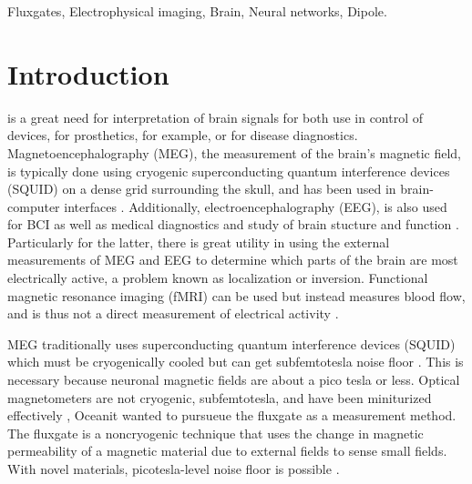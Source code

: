 \documentclass[journal,12pt,onecolumn,draftclsnofoot]{IEEEtran}
\begin{document}
\begin{IEEEkeywords}
Fluxgates, Electrophysical imaging, Brain, Neural networks, Dipole.
\end{IEEEkeywords}



\IEEEpeerreviewmaketitle



\section{Introduction}

 is a great need for interpretation of brain signals for both use in control of devices, for prosthetics, for example, or for disease diagnostics. Magnetoencephalography (MEG), the measurement of the brain's magnetic field, is typically done using cryogenic superconducting quantum interference devices (SQUID) on a dense grid surrounding the skull, and has been used in brain-computer interfaces \cite{mellinger2007meg}. Additionally, electroencephalography (EEG), is also used for BCI as well as medical diagnostics and study of brain stucture and function \cite{da2008impact}. Particularly for the latter, there is great utility in using the external measurements of MEG and EEG to determine which parts of the brain are most electrically active, a problem known as localization or inversion. Functional magnetic resonance imaging (fMRI) can be used but instead measures blood flow, and is thus not a direct measurement of electrical activity \cite{sharon2007advantage}.

MEG traditionally uses superconducting quantum interference devices (SQUID) which must be cryogenically cooled but can get subfemtotesla noise floor \cite{ilmoniemi1984four}. This is necessary because neuronal magnetic fields are about a pico tesla or less. Optical magnetometers are not cryogenic, subfemtotesla, and have been miniturized effectively \cite{preusser2009microfabricated}, Oceanit wanted to pursueue the fluxgate \cite{primdahl1979fluxgate} as a measurement method. The fluxgate is a noncryogenic technique that uses the change in magnetic permeability of a magnetic material due to external fields to sense small fields. With novel materials, picotesla-level noise floor is possible \cite{sasada2014fundamental}.
\end{document}
